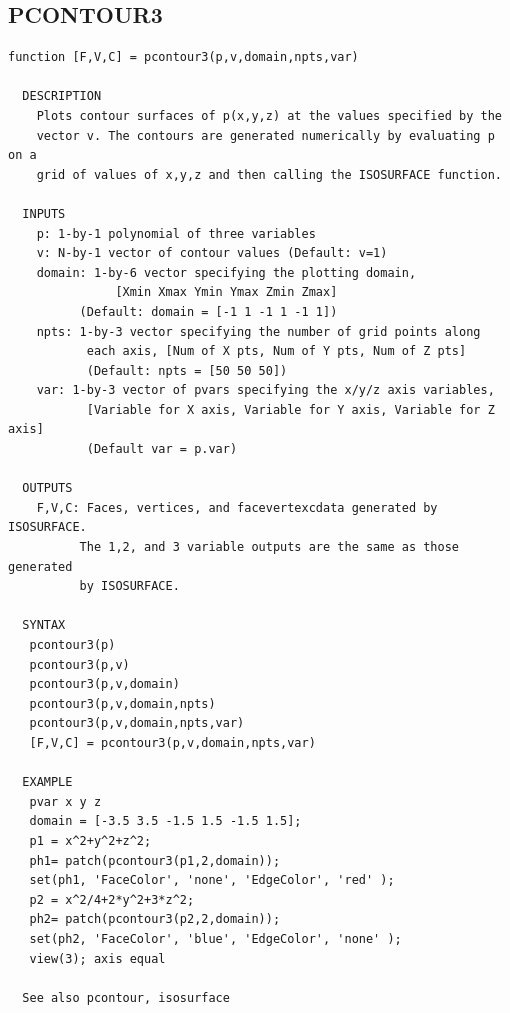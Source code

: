 \documentclass{article}
\begin{document}
\newpage
\subsection{PCONTOUR3}
\begin{verbatim}
function [F,V,C] = pcontour3(p,v,domain,npts,var)

  DESCRIPTION
    Plots contour surfaces of p(x,y,z) at the values specified by the
    vector v. The contours are generated numerically by evaluating p on a
    grid of values of x,y,z and then calling the ISOSURFACE function.

  INPUTS
    p: 1-by-1 polynomial of three variables
    v: N-by-1 vector of contour values (Default: v=1)
    domain: 1-by-6 vector specifying the plotting domain,
               [Xmin Xmax Ymin Ymax Zmin Zmax]
          (Default: domain = [-1 1 -1 1 -1 1])
    npts: 1-by-3 vector specifying the number of grid points along
           each axis, [Num of X pts, Num of Y pts, Num of Z pts]
           (Default: npts = [50 50 50])
    var: 1-by-3 vector of pvars specifying the x/y/z axis variables,
           [Variable for X axis, Variable for Y axis, Variable for Z axis]
           (Default var = p.var)

  OUTPUTS
    F,V,C: Faces, vertices, and facevertexcdata generated by ISOSURFACE.
          The 1,2, and 3 variable outputs are the same as those generated
          by ISOSURFACE.

  SYNTAX
   pcontour3(p)
   pcontour3(p,v)
   pcontour3(p,v,domain)
   pcontour3(p,v,domain,npts)
   pcontour3(p,v,domain,npts,var)
   [F,V,C] = pcontour3(p,v,domain,npts,var)

  EXAMPLE
   pvar x y z
   domain = [-3.5 3.5 -1.5 1.5 -1.5 1.5];
   p1 = x^2+y^2+z^2;
   ph1= patch(pcontour3(p1,2,domain));
   set(ph1, 'FaceColor', 'none', 'EdgeColor', 'red' );
   p2 = x^2/4+2*y^2+3*z^2;
   ph2= patch(pcontour3(p2,2,domain));
   set(ph2, 'FaceColor', 'blue', 'EdgeColor', 'none' );
   view(3); axis equal

  See also pcontour, isosurface

\end{verbatim}
\end{document}
